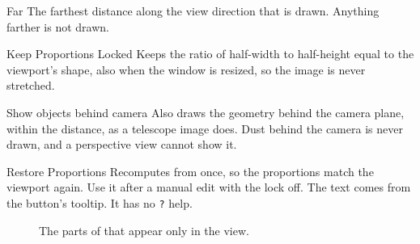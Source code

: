 \begin{uipanel}
\begin{uiproperty}[key=ortho-far, id=OrthoFarHelp, type={slider, logarithmic},
    range={\qty{1e-12}{\AU} to \qty{1000}{\AU}}, effect=camera, saved=file,
    visible={Orthographic}, help=Tabs_Settings_HelpViewOrthoFar]{Far}
The farthest distance along the view direction that is drawn. Anything farther is not drawn.
\end{uiproperty}

\begin{uiproperty}[key=proportions-lock, id=OrthoProportionsLock, type={check box},
    default={on}, effect=camera, saved=file, visible={Orthographic},
    help=Tabs_Settings_HelpViewProportionsLock]{Keep Proportions Locked}
Keeps the ratio of half-width to half-height equal to the viewport's shape, also when the
window is resized, so the image is never stretched.
\end{uiproperty}

\begin{uiproperty}[key=behind-camera, id=ShowBehindCameraCheckBox, type={check box},
    default={on}, effect=display, saved=file, visible={Orthographic},
    help=Tabs_Settings_HelpViewShowBehindCamera]{Show objects behind camera}
Also draws the geometry behind the camera plane, within the  distance, as a
telescope image does. Dust behind the camera is never drawn, and a perspective view cannot
show it.
\end{uiproperty}

\begin{uiproperty}[key=restore-proportions, id=RestoreOrthoProportionsButton, type={button},
    effect=action, visible={Orthographic}]{Restore Proportions}
Recomputes  from  once, so the proportions match
the viewport again. Use it after a manual edit with the lock off. The text comes from the
button's tooltip. It has no \texttt{?} help.
\end{uiproperty}


\begin{figure}[htbp]
  \centering
  \caption{The parts of  that appear only in the
     view.}
  \label{fig:settings-viewport-nucleus}
\end{figure}


\end{uipanel}
